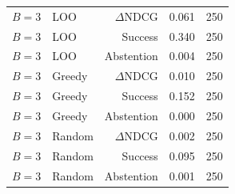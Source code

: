\begin{table}[t]
\begin{tabular}{llrrr}
$B=3$ & LOO & $\Delta$NDCG & 0.061 & 250 \\
$B=3$ & LOO & Success & 0.340 & 250 \\
$B=3$ & LOO & Abstention & 0.004 & 250 \\
$B=3$ & Greedy & $\Delta$NDCG & 0.010 & 250 \\
$B=3$ & Greedy & Success & 0.152 & 250 \\
$B=3$ & Greedy & Abstention & 0.000 & 250 \\
$B=3$ & Random & $\Delta$NDCG & 0.002 & 250 \\
$B=3$ & Random & Success & 0.095 & 250 \\
$B=3$ & Random & Abstention & 0.001 & 250 \\
\bottomrule
\end{tabular}
\end{table}